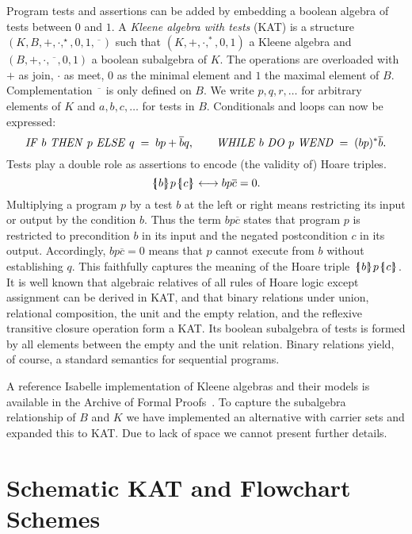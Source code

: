 \documentclass{llncs}
\newcommand{\nkat}{\overline{\phantom{x}}}
\newcommand{\llbrace}{\hspace{1pt} \lbrace \kern -3pt \vert \hspace{1pt}}
\newcommand{\rrbrace}{\hspace{0.5pt} \rbrace \kern -5pt \vert \hspace{3pt}}
\newcommand{\ifthenelse}[3]{\text{\textit{IF} $#1$ \textit{THEN} $#2$ \textit{ELSE} $#3$}}
\newcommand{\while}[2]{\text{\textit{WHILE} $#1$ \textit{DO} $#2$ \textit{WEND}}}
\newcommand{\triple}[3]{\llbrace #1 \rrbrace #2 \llbrace #3 \rrbrace}
\begin{document}
Program tests and assertions can be added by embedding a boolean
algebra of tests between $0$ and $1$.  A \emph{Kleene algebra with
  tests} (KAT) is a structure $(K,B,+,\cdot,^\star,0,1,\nkat)$ such
that $(K,+,\cdot,^\ast,0,1)$ a Kleene algebra and
$(B,+,\cdot,\nkat,0,1)$ a boolean subalgebra of $K$. The operations
are overloaded with $+$ as join, $\cdot$ as meet, $0$ as the minimal
element and $1$ the maximal element of $B$. Complementation $\nkat$ is
only defined on $B$. We write $p,q,r,\dots$ for
arbitrary elements of $K$ and $a,b,c,\dots$ for tests in
$B$. Conditionals and loops can now be expressed:
\begin{equation*}
\ifthenelse{b}{p}{q} \;=\; bp + \overline{b}q,\qquad
\while{b}{p} \;=\; (bp)^\ast \overline{b}.
\end{equation*}
Tests play a double role as assertions to encode (the validity of)
Hoare triples.
\begin{equation*}
\label{eq:kathoare}
\triple{b}{p}{c} \longleftrightarrow
bp\overline{c} = 0.
\end{equation*}
Multiplying a program $p$ by a test $b$ at the left or right means
restricting its input or output by the condition $b$. Thus the term
$bp\overline{c}$ states that program $p$ is restricted to precondition
$b$ in its input and the negated postcondition $c$ in its
output. Accordingly, $bp\overline{c}=0$ means that $p$ cannot execute
from $b$ without establishing $q$. This faithfully captures the
meaning of the Hoare triple $\triple{b}{p}{c}$. It is well known that
algebraic relatives of all rules of Hoare logic except assignment can
be derived in KAT, and that binary relations under union, relational
composition, the unit and the empty relation, and the reflexive
transitive closure operation form a KAT. Its boolean subalgebra of
tests is formed by all elements between the empty and the unit
relation. Binary relations yield, of course, a standard semantics for
sequential programs.

A reference Isabelle implementation of Kleene algebras and their
models is available in the Archive of Formal Proofs~\cite{Archive}. To
capture the subalgebra relationship of $B$ and $K$ we have implemented
an alternative with carrier sets and expanded this to KAT. Due to lack
of space we cannot present further details.


\section{Schematic KAT and Flowchart Schemes}
\label{sec:skat}
\end{document}
